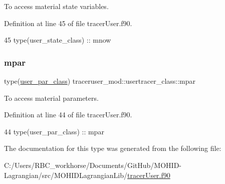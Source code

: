 To access material state variables. 



Definition at line 45 of file tracer\+User.\+f90.


\begin{DoxyCode}
45         \textcolor{keywordtype}{type}(user\_state\_class) :: mnow
\end{DoxyCode}
\mbox{\label{structtraceruser__mod_1_1usertracer__class_a59203a4d0541f8d28381d7bc7c68ca15}} 
\subsubsection{\texorpdfstring{mpar}{mpar}}
{\footnotesize\ttfamily type(\mbox{\hyperlink{structtraceruser__mod_1_1user__par__class}{user\+\_\+par\+\_\+class}}) traceruser\+\_\+mod\+::usertracer\+\_\+class\+::mpar\hspace{0.3cm}{\ttfamily [private]}}



To access material parameters. 



Definition at line 44 of file tracer\+User.\+f90.


\begin{DoxyCode}
44         \textcolor{keywordtype}{type}(user\_par\_class)   :: mpar
\end{DoxyCode}


The documentation for this type was generated from the following file\+:\begin{DoxyCompactItemize}
\item 
C\+:/\+Users/\+R\+B\+C\+\_\+workhorse/\+Documents/\+Git\+Hub/\+M\+O\+H\+I\+D-\/\+Lagrangian/src/\+M\+O\+H\+I\+D\+Lagrangian\+Lib/\mbox{\hyperlink{tracer_user_8f90}{tracer\+User.\+f90}}\end{DoxyCompactItemize}
